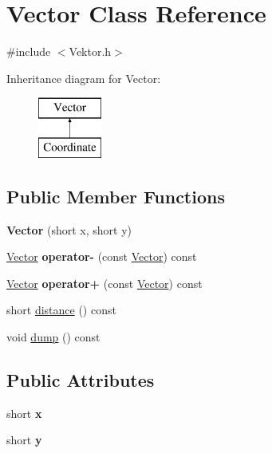 \hypertarget{class_vector}{\section{Vector Class Reference}
\label{class_vector}
}


{\ttfamily \#include $<$Vektor.\-h$>$}

Inheritance diagram for Vector\-:\begin{figure}[H]
\begin{center}
\leavevmode
\includegraphics[height=2.000000cm]{class_vector}
\end{center}
\end{figure}
\subsection*{Public Member Functions}
\begin{DoxyCompactItemize}
\item 
\hypertarget{class_vector_adbd8debb014cdfb97224a1d57b8d44a6}{{\bfseries Vector} (short x, short y)}\label{class_vector_adbd8debb014cdfb97224a1d57b8d44a6}

\item 
\hypertarget{class_vector_aa283b61aaf9c0895288df72a56ac8899}{\hyperlink{class_vector}{Vector} {\bfseries operator-\/} (const \hyperlink{class_vector}{Vector}) const }\label{class_vector_aa283b61aaf9c0895288df72a56ac8899}

\item 
\hypertarget{class_vector_aad6d0d53c60571b1bbc52f1ecbc7b0c0}{\hyperlink{class_vector}{Vector} {\bfseries operator+} (const \hyperlink{class_vector}{Vector}) const }\label{class_vector_aad6d0d53c60571b1bbc52f1ecbc7b0c0}

\item 
short \hyperlink{class_vector_ac57f428cc1e03ce8cd3c9f6c98a8336f}{distance} () const 
\item 
void \hyperlink{class_vector_a50123df9754e508f3d4aa7cb72f38905}{dump} () const 
\end{DoxyCompactItemize}
\subsection*{Public Attributes}
\begin{DoxyCompactItemize}
\item 
\hypertarget{class_vector_a6784dd08f2e63d06fd376ddaa641f54c}{short {\bfseries x}}\label{class_vector_a6784dd08f2e63d06fd376ddaa641f54c}

\item 
\hypertarget{class_vector_a17bf7f9707a6ba166c08472377c8c732}{short {\bfseries y}}\label{class_vector_a17bf7f9707a6ba166c08472377c8c732}

\end{DoxyCompactItemize}


